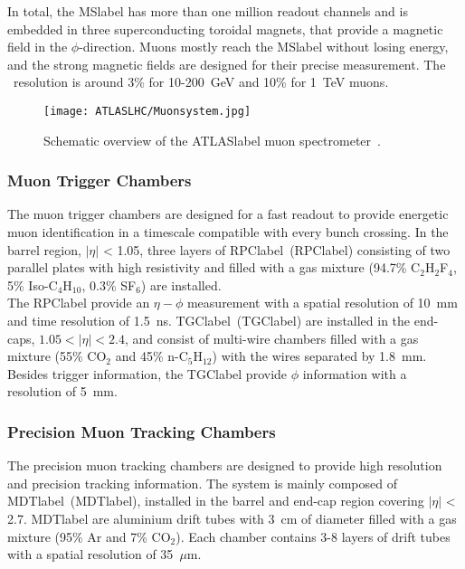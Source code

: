 In total, the \acrshort{MSlabel} has more than one million readout channels and is embedded in three superconducting toroidal magnets, that provide a magnetic field in the $\phi$-direction. Muons mostly reach the \acrshort{MSlabel} without losing energy, and the strong magnetic fields are designed for their precise measurement. The \pT\ resolution is around 3\% for 10-200~GeV and 10\% for 1~TeV muons. 

\begin{figure}[htbp]
    \RawFloats
    \begin{center}
    \texttt{[image: ATLASLHC/Muonsystem.jpg]}
    \caption{
        Schematic overview of the \acrshort{ATLASlabel} muon spectrometer~\cite{Collaboration_2008}. 
    }
    \label{figLHC:ATLASMuon}
    \end{center}
\end{figure}

\subsubsection*{Muon Trigger Chambers}

The muon trigger chambers are designed for a fast readout to provide energetic muon identification in a timescale compatible with every bunch crossing. In the barrel region, $|\eta|$ < 1.05, three layers of \acrlong{RPClabel}~(\acrshort{RPClabel}) consisting of two parallel plates with high resistivity and filled with a gas mixture (94.7\% C$_2$H$_2$F$_4$, 5\% Iso-C$_4$H$_{10}$, 0.3\% SF$_6$) are installed.\\

The \acrshort{RPClabel} provide an $\eta-\phi$ measurement with a spatial resolution of 10~mm and time resolution of 1.5~ns. \acrlong{TGClabel}~(\acrshort{TGClabel}) are installed in the end-caps, $1.05 < |\eta| < 2.4$, and consist of multi-wire chambers filled with a gas mixture (55\% CO$_2$ and 45\% n-C$_5$H$_{12}$) with the wires separated by 1.8~mm. Besides trigger information, the \acrshort{TGClabel} provide $\phi$ information with a resolution of 5~mm.

\subsubsection*{Precision Muon Tracking Chambers}

The precision muon tracking chambers are designed to provide high resolution and precision tracking information. The system is mainly composed of \acrlong{MDTlabel}~(\acrshort{MDTlabel}), installed in the barrel and end-cap region covering $|\eta|$ < 2.7. \acrshort{MDTlabel} are aluminium drift tubes with 3~cm of diameter filled with a gas mixture (95\% Ar and 7\% \ensuremath{\mathrm{CO_2}}). Each chamber contains 3-8 layers of drift tubes with a spatial resolution of 35~$\mu$m.\\

